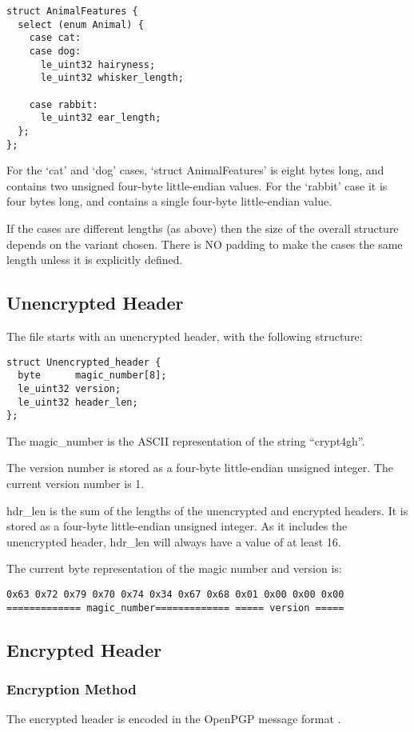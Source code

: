 \documentclass[10pt]{article}
\begin{document}
\begin{verbatim}
struct AnimalFeatures {
  select (enum Animal) {
    case cat:
    case dog:
      le_uint32 hairyness;
      le_uint32 whisker_length;

    case rabbit:
      le_uint32 ear_length;
  };
};
\end{verbatim}

For the `cat' and `dog' cases, `struct AnimalFeatures' is eight bytes long, and contains two unsigned four-byte
little-endian values.
For the `rabbit' case it is four bytes long, and contains a single four-byte little-endian value.

If the cases are different lengths (as above) then the size of the overall structure depends on the variant chosen.
There is NO padding to make the cases the same length unless it is explicitly defined.

\subsection{Unencrypted Header}

The file starts with an unencrypted header, with the following structure:

\begin{verbatim}
struct Unencrypted_header {
  byte      magic_number[8];
  le_uint32 version;
  le_uint32 header_len;
};
\end{verbatim}

The magic\_number is the ASCII representation of the string ``crypt4gh''.

The version number is stored as a four-byte little-endian unsigned integer.
The current version number is 1.

hdr\_len is the sum of the lengths of the unencrypted and encrypted headers.
It is stored as a four-byte little-endian unsigned integer.
As it includes the unencrypted header, hdr\_len will always have a value of at least 16.

The current byte representation of the magic number and version is:
\begin{verbatim}
0x63 0x72 0x79 0x70 0x74 0x34 0x67 0x68 0x01 0x00 0x00 0x00
============= magic_number============= ===== version =====
\end{verbatim}

\subsection{Encrypted Header}
\subsubsection{Encryption Method}
The encrypted header is encoded in the OpenPGP message format \cite{RFC4880}.
\end{document}

